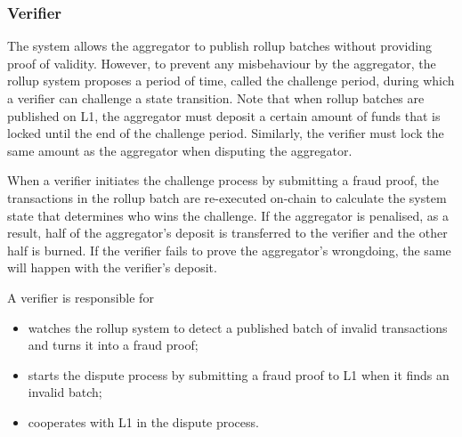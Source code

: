 \documentclass{article}
\begin{document}

\subsubsection{Verifier}
The system allows the aggregator to publish rollup batches without providing proof of validity. However, to prevent any misbehaviour by the aggregator, the rollup system proposes a period of time, called the challenge period, during which a verifier can challenge a state transition. Note that when rollup batches are published on L1, the aggregator must deposit a certain amount of funds that is locked until the end of the challenge period. Similarly, the verifier must lock the same amount as the aggregator when disputing the aggregator.

When a verifier initiates the challenge process by submitting a fraud proof, the transactions in the rollup batch are re-executed on-chain to calculate the system state that determines who wins the challenge. If the aggregator is penalised, as a result, half of the aggregator's deposit is transferred to the verifier and the other half is burned. If the verifier fails to prove the aggregator's wrongdoing, the same will happen with the verifier's deposit.

A verifier is responsible for
\begin{itemize} 
\item watches the rollup system to detect a published batch of invalid transactions and turns it into a fraud proof;
\item starts the dispute process by submitting a fraud proof to L1 when it finds an invalid batch; 
\item cooperates with L1 in the dispute process.
\end{itemize}
\end{document}
